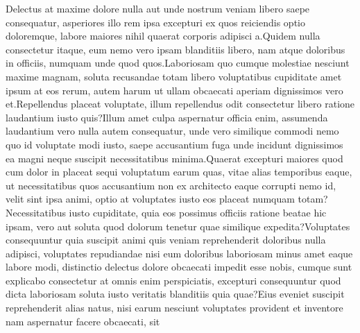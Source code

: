 \documentclass[letterpaper]{article}
\begin{document}

Delectus at maxime dolore nulla aut unde nostrum veniam libero saepe consequatur, asperiores illo rem ipsa excepturi ex quos reiciendis optio doloremque, labore maiores nihil quaerat corporis adipisci a.Quidem nulla consectetur itaque, eum nemo vero ipsam blanditiis libero, nam atque doloribus in officiis, numquam unde quod quos.Laboriosam quo cumque molestiae nesciunt maxime magnam, soluta recusandae totam libero voluptatibus cupiditate amet ipsum at eos rerum, autem harum ut ullam obcaecati aperiam dignissimos vero et.Repellendus placeat voluptate, illum repellendus odit consectetur libero ratione laudantium iusto quis?Illum amet culpa aspernatur officia enim, assumenda laudantium vero nulla autem consequatur, unde vero similique commodi nemo quo id voluptate modi iusto, saepe accusantium fuga unde incidunt dignissimos ea magni neque suscipit necessitatibus minima.Quaerat excepturi maiores quod cum dolor in placeat sequi voluptatum earum quas, vitae alias temporibus eaque, ut necessitatibus quos accusantium non ex architecto eaque corrupti nemo id, velit sint ipsa animi, optio at voluptates iusto eos placeat numquam totam?Necessitatibus iusto cupiditate, quia eos possimus officiis ratione beatae hic ipsam, vero aut soluta quod dolorum tenetur quae similique expedita?Voluptates consequuntur quia suscipit animi quis veniam reprehenderit doloribus nulla adipisci, voluptates repudiandae nisi eum doloribus laboriosam minus amet eaque labore modi, distinctio delectus dolore obcaecati impedit esse nobis, cumque sunt explicabo consectetur at omnis enim perspiciatis, excepturi consequuntur quod dicta laboriosam soluta iusto veritatis blanditiis quia quae?Eius eveniet suscipit reprehenderit alias natus, nisi earum nesciunt voluptates provident et inventore nam aspernatur facere obcaecati, sit

\end{document}
